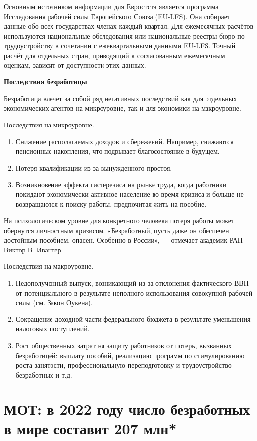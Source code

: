 Основным источником информации для Евростста является программа Исследования рабочей силы Европейского Союза (EU-LFS). Она собирает данные обо всех государствах-членах каждый квартал. Для ежемесячных расчётов используются национальные обследования или национальные реестры бюро по трудоустройству в сочетании с ежеквартальными данными EU-LFS. Точный расчёт для отдельных стран, приводящий к согласованным ежемесячным оценкам, зависит от доступности этих данных.

\textbf{Последствия безработицы}

Безработица влечет за собой ряд негативных последствий как для отдельных экономических агентов на микроуровне, так и для экономики на макроуровне.

Последствия на микроуровне.
\begin{enumerate}
    \item Снижение располагаемых доходов и сбережений. Например, снижаются пенсионные накопления, что подрывает благосостояние в будущем.
    \item Потеря квалификации из-за вынужденного простоя.
    \item Возникновение эффекта гистерезиса на рынке труда, когда работники покидают экономически активное население во время кризиса и больше не возвращаются к поиску работы, предпочитая жить на пособие.
\end{enumerate}
На психологическом уровне для конкретного человека потеря работы может обернутся личностным кризисом. «Безработный, пусть даже он обеспечен достойным пособием, опасен. Особенно в России», — отмечает академик РАН Виктор В. Ивантер.

Последствия на макроуровне.
\begin{enumerate}
    \item Недополученный выпуск, возникающий из-за отклонения фактического ВВП от потенциального в результате неполного использования совокупной рабочей силы (см. Закон Оукена).
    \item Сокращение доходной части федерального бюджета в результате уменьшения налоговых поступлений.
    \item Рост общественных затрат на защиту работников от потерь, вызванных безработицей: выплату пособий, реализацию программ по стимулированию роста занятости, профессиональную переподготовку и трудоустройство безработных и т.д.
\end{enumerate}

\newpage
\section{МОТ: в 2022 году число безработных в мире составит 207 млн*}

